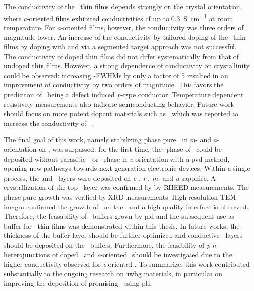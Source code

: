 The conductivity of the \cro\ thin films depends strongly on the crystal orientation, where \textit{c}-oriented films exhibited conductivities of up to \qty{0.3}{\siemens\per\cm} at room temperature.
For \textit{a}-oriented films, however, the conductivity was three orders of magnitude lower.
An increase of the conductivity by tailored doping of the \cro\ thin films by doping with  and  via a segmented target approach was not successful.
The conductivity of doped thin films did not differ systematically from that of undoped thin films.
However, a strong dependence of conductivity on crystallinity could be observed: increasing \textomega-FWHMs by only a factor of 5 resulted in an improvement of conductivity by two orders of magnitude.
This favors the prediciton
    \cite{mi2018}
of \cro\ being a defect induced \textit{p}-type conductor.
Temperature dependent resistivity measurements also indicate semiconducting behavior.
Future work should focus on more potent dopant materials such as , which was reported to increase the conductivity of \cro\
    \cite{uekawa1996}.

The final goal of this work, namely stabilizing phase pure \agao\ in \textit{m}- and \textit{a}-orientation on \cro, was surpassed:
for the first time, the \textalpha-phase of \gao\ could be deposited without parasitic \textbeta- or \textkappa-phase in \textit{c}-orientation with a \acrfull{pvd} method, opening new pathways towards next-generation electronic devices.
Within a single process, the \cro and \agao\ layers were deposited on \textit{c}-, \textit{r}-, \textit{m}- and \textit{a}-sapphire.
A crystallization of the top \agao\ layer was confirmed by by \acrshort{RHEED} measurements.
The phase pure growth was verified by \acrshort{XRD} measurements.
High resolution \acrshort{TEM} images confirmed the growth of \agao\ on the \cro\ and a high-quality interface is observed.
Therefore, the feasability of \cro\ buffers grown by \acrshort{pld} and the subsequent use as buffer for \gao\ thin films was demonstrated within this thesis. 
In future works, the thickness of the buffer layer should be further optimized and conductive \gao\ layers should be deposited on the \cro\ buffers.
Furthermore, the feasibility of \textit{p}-\textit{n} heterojunctions of \ce{Mg} doped \cro\ and \textit{c}-oriented \agao\ should be investigated due to the higher conductivity observed for \textit{c}-oriented \cro.
To summarize, this work contributed substantially to the ongoing research on \acrshort{uwbg} materials, in particular on improving the deposition of promising \agao\ using \acrlong{pld}.